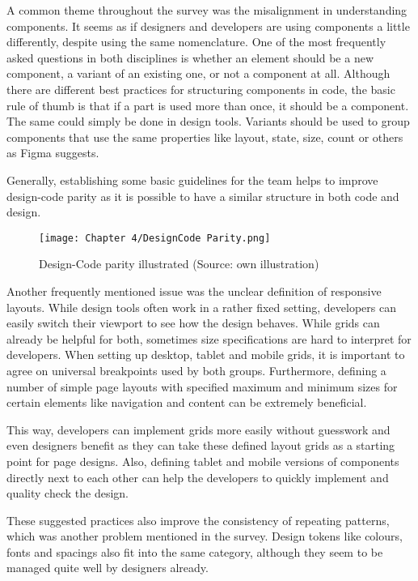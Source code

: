A common theme throughout the survey was the misalignment in understanding components. It seems as
if designers and developers are using components a little differently, despite using the same
nomenclature. One of the most frequently asked questions in both disciplines is whether an element
should be a new component, a variant of an existing one, or not a component at all. Although there
are different best practices for structuring components in code, the basic rule of thumb is that if
a part is used more than once, it should be a component. The same could simply be done in design
tools. Variants should be used to group components that use the same properties like layout, state,
size, count or others as Figma suggests. 

Generally, establishing some basic guidelines for the team helps to improve design-code parity as it
is possible to have a similar structure in both code and design.
\begin{figure}[H]
    \centering
    \texttt{[image: Chapter 4/DesignCode Parity.png]}
    \caption{Design-Code parity illustrated (Source: own illustration)}
\end{figure}

Another frequently mentioned issue was the unclear definition of responsive layouts. While design
tools often work in a rather fixed setting, developers can easily switch their viewport to see how
the design behaves. While grids can already be helpful for both, sometimes size specifications are
hard to interpret for developers. When setting up desktop, tablet and mobile grids, it is important
to agree on universal breakpoints used by both groups. Furthermore, defining a number of simple page
layouts with specified maximum and minimum sizes for certain elements like navigation and content
can be extremely beneficial.

This way, developers can implement grids more easily without guesswork and even designers benefit as
they can take these defined layout grids as a starting point for page designs. Also, defining tablet
and mobile versions of components directly next to each other can help the developers to quickly
implement and quality check the design.

These suggested practices also improve the consistency of repeating patterns, which was another
problem mentioned in the survey. Design tokens like colours, fonts and spacings also fit into the
same category, although they seem to be managed quite well by designers already.

